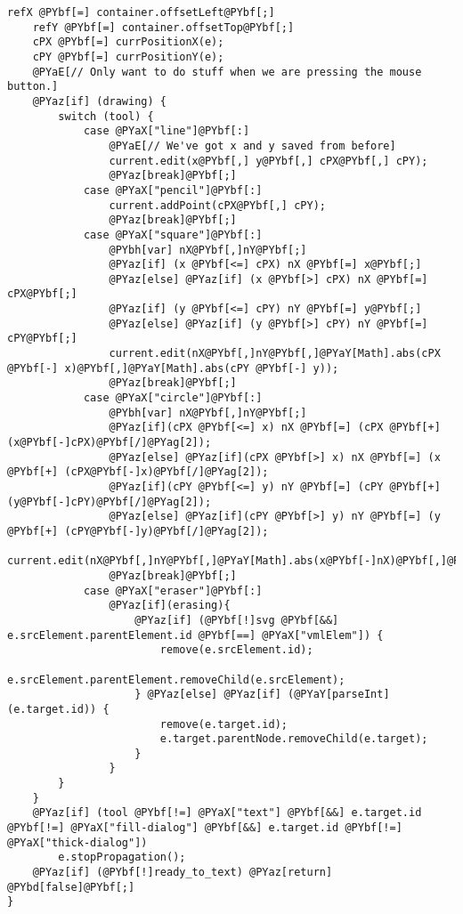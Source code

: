 \begin{Verbatim}[commandchars=@\[\]]
    refX @PYbf[=] container.offsetLeft@PYbf[;]
    refY @PYbf[=] container.offsetTop@PYbf[;]
    cPX @PYbf[=] currPositionX(e);
    cPY @PYbf[=] currPositionY(e);
    @PYaE[// Only want to do stuff when we are pressing the mouse button.]
    @PYaz[if] (drawing) {
        switch (tool) {
            case @PYaX["line"]@PYbf[:]
				@PYaE[// We've got x and y saved from before]
                current.edit(x@PYbf[,] y@PYbf[,] cPX@PYbf[,] cPY);
                @PYaz[break]@PYbf[;]
			case @PYaX["pencil"]@PYbf[:]
                current.addPoint(cPX@PYbf[,] cPY);
                @PYaz[break]@PYbf[;]
            case @PYaX["square"]@PYbf[:]
				@PYbh[var] nX@PYbf[,]nY@PYbf[;]
			    @PYaz[if] (x @PYbf[<=] cPX) nX @PYbf[=] x@PYbf[;]
			    @PYaz[else] @PYaz[if] (x @PYbf[>] cPX) nX @PYbf[=] cPX@PYbf[;]
			    @PYaz[if] (y @PYbf[<=] cPY) nY @PYbf[=] y@PYbf[;]
			    @PYaz[else] @PYaz[if] (y @PYbf[>] cPY) nY @PYbf[=] cPY@PYbf[;]
				current.edit(nX@PYbf[,]nY@PYbf[,]@PYaY[Math].abs(cPX @PYbf[-] x)@PYbf[,]@PYaY[Math].abs(cPY @PYbf[-] y));
                @PYaz[break]@PYbf[;]
            case @PYaX["circle"]@PYbf[:]
				@PYbh[var] nX@PYbf[,]nY@PYbf[;]
				@PYaz[if](cPX @PYbf[<=] x) nX @PYbf[=] (cPX @PYbf[+] (x@PYbf[-]cPX)@PYbf[/]@PYag[2]);
				@PYaz[else] @PYaz[if](cPX @PYbf[>] x) nX @PYbf[=] (x @PYbf[+] (cPX@PYbf[-]x)@PYbf[/]@PYag[2]);
				@PYaz[if](cPY @PYbf[<=] y) nY @PYbf[=] (cPY @PYbf[+] (y@PYbf[-]cPY)@PYbf[/]@PYag[2]);
				@PYaz[else] @PYaz[if](cPY @PYbf[>] y) nY @PYbf[=] (y @PYbf[+] (cPY@PYbf[-]y)@PYbf[/]@PYag[2]);
                current.edit(nX@PYbf[,]nY@PYbf[,]@PYaY[Math].abs(x@PYbf[-]nX)@PYbf[,]@PYaY[Math].abs(y@PYbf[-]nY));
				@PYaz[break]@PYbf[;]
			case @PYaX["eraser"]@PYbf[:]
				@PYaz[if](erasing){
					@PYaz[if] (@PYbf[!]svg @PYbf[&&] e.srcElement.parentElement.id @PYbf[==] @PYaX["vmlElem"]) {
						remove(e.srcElement.id);
						e.srcElement.parentElement.removeChild(e.srcElement);
					} @PYaz[else] @PYaz[if] (@PYaY[parseInt](e.target.id)) {
						remove(e.target.id);
						e.target.parentNode.removeChild(e.target);
					}
				}
        }
    }
	@PYaz[if] (tool @PYbf[!=] @PYaX["text"] @PYbf[&&] e.target.id @PYbf[!=] @PYaX["fill-dialog"] @PYbf[&&] e.target.id @PYbf[!=] @PYaX["thick-dialog"]) 
		e.stopPropagation();
	@PYaz[if] (@PYbf[!]ready_to_text) @PYaz[return] @PYbd[false]@PYbf[;]
}



\end{Verbatim}
